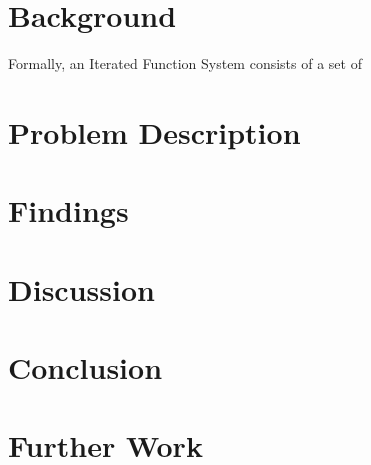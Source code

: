 \documentclass[11pt]{article}
\begin{document}
\section{Background}
\label{sec:orgd4fe10a}

Formally, an Iterated Function System consists of a set of 

\section{Problem Description}
\label{sec:orgb2ab338}

\section{Findings}
\label{sec:org08a0eac}

\section{Discussion}
\label{sec:org914fb67}

\section{Conclusion}
\label{sec:org58f533e}

\section{Further Work}
\label{sec:org52978d3}
\end{document}
